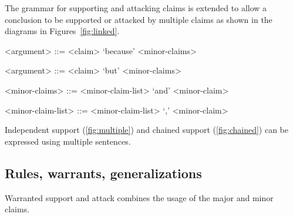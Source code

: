 The grammar for supporting and attacking claims is extended to allow a conclusion to be supported or attacked by multiple claims as shown in the diagrams in Figures~\ref{fig:linked}.

\begin{grammar}
<argument> ::= <claim> `because' <minor-claims> %

<argument> ::= <claim> `but' <minor-claims> %

<minor-claims> ::= <minor-claim-list> `and' <minor-claim>

<minor-claim-list> ::= <minor-claim-list> `,' <minor-claim>
\end{grammar}

\noindent Independent support (\autoref{fig:multiple}) and chained support (\autoref{fig:chained}) can be expressed using multiple sentences.

\subsection{Rules, warrants, generalizations}
Warranted support and attack combines the usage of the major and minor claims.

